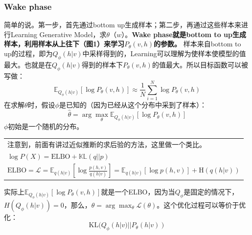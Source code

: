 \documentclass[a4paper]{article}
\begin{document}
\subsubsection{Wake phase}
简单的说。第一步，首先通过bottom up生成样本；第二步，再通过这些样本来进行Learning Generative Model，求$\theta$（$w$）。\textbf{Wake phase就是bottom to up生成样本，利用样本从上往下（图1）来学习$P_\theta(v,h)$的参数。}
样本来自bottom to up的过程，即为$Q_\phi(h|v)$中采样得到的，Learning可以理解为使样本使模型的值最大。也就是在$Q_\phi(h|v)$得到的样本下$P_\theta(v,h)$的值最大。所以目标函数可以被写做：
\begin{equation}
    \mathbb{E}_{Q_\phi(h|v)}[\log P_\theta(v,h)] \approx \frac{1}{N} \sum_{i=1}^N \log P_\theta(v,h)
\end{equation}
在求解$\theta$时，假设$\phi$是已知的（因为已经从这个分布中采到了样本）：
\begin{equation}
    \hat{\theta} = \arg\max_\theta \mathbb{E}_{Q_\phi(h|v)}[\log P_\theta(v,h)]
\end{equation}
$\phi$初始是一个随机的分布。

\begin{table}[H]
    \centering
    \begin{tabular}{l}
    \hline
    注意到，前面有讲过近似推断的求后验的方法，这里做一个类比。
    \\
    $\log P(X) = \mathrm{ELBO} + \mathbb{KL}(q||p)$ \\
    $\mathrm{ELBO} = \mathcal{L} = \mathbb{E}_{q(h|v)} \left[ \log\frac{p(h,v)}{q(h|v)}\right] = \mathbb{E}_{q(h|v)} \left[ \log p(h,v) \right] + \mathrm{H}(q(h|v))$\\
    \hline
    \end{tabular}
    \label{tab:my_label}
\end{table}
实际上$\mathbb{E}_{Q_\phi(h|v)}[\log P_\theta(v,h)]$就是一个ELBO，因为当$Q_\phi$是固定的情况下，$H(Q_\phi(h|v))=0$，那么，$\hat{\theta} = \arg\max_\theta \mathcal{L}(\theta)$。这个优化过程可以等价于优化：
\begin{equation}
    \mathrm{KL}(Q_\phi(h|v) || P_\theta(h|v))
\end{equation}
\end{document}
